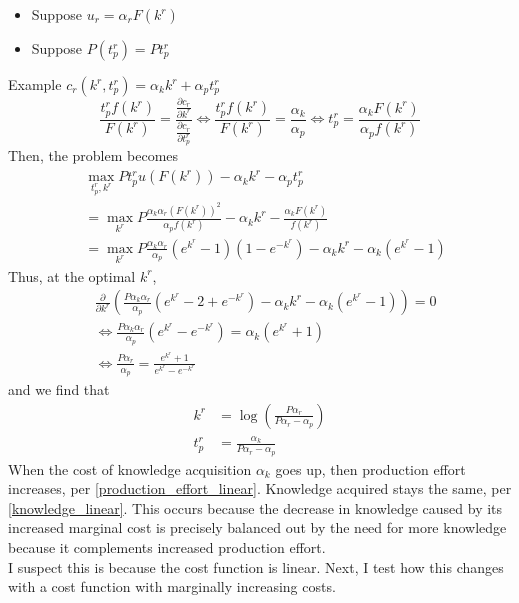 \documentclass[source/paper/main.tex]{subfiles}
\begin{document}
\begin{itemize}
    \item Suppose $u_r = \alpha_r F(k^r)$
    \item Suppose $P(t_p^r) = P t_p^r$
\end{itemize}
Example $c_r(k^r, t_p^r) = \alpha_k k^r + \alpha_p t_p^r$\\
$$\frac{t_p^r f(k^r) }{F(k^r)} = \frac{\frac{\partial c_r}{\partial k^r}}{\frac{\partial c_r}{\partial t_p^r}} \iff \frac{t_p^r f(k^r) }{F(k^r)} = \frac{\alpha_k}{\alpha_p} \iff t_p^r = \frac{\alpha_k F(k^r)}{\alpha_p f(k^r)}$$
Then, the problem becomes
\begin{align*}
    &\max_{t_p^r, k^r} P t_p^r u(F(k^r)) - \alpha_k k^r - \alpha_p t_p^r \\
    &= \max_{k^r} P\frac{\alpha_k\alpha_r (F(k^r))^2}{\alpha_p f(k^r)}  - \alpha_k k^r - \frac{\alpha_k F(k^r)}{f(k^r)} \\
    &= \max_{k^r} P\frac{\alpha_k\alpha_r}{\alpha_p} (e^{k^r} - 1)(1-e^{-k^r})  - \alpha_k k^r -\alpha_k (e^{k^r} - 1) 
\end{align*}
Thus, at the optimal $k^r$, 
\begin{align*}
    &\frac{\partial }{\partial k^r} \left(  \frac{P\alpha_k\alpha_r}{\alpha_p} (e^{k^r} - 2 + e^{-k^r}) - \alpha_k k^r - \alpha_k (e^{k^r} - 1)\right) = 0 \\
    &\iff   \frac{P\alpha_k\alpha_r}{\alpha_p} (e^{k^r} - e^{-k^r})  = \alpha_k(e^{k^r} + 1) \\
    &\iff \frac{P\alpha_r}{\alpha_p}  = \frac{e^{k^r} + 1}{e^{k^r} - e^{-k^r}} 
\end{align*}
and we find that
\begin{align}
    k^r &= \log\left(\frac{P\alpha_r}{P\alpha_r-\alpha_p}\right) \label{knowledge_linear}\\
    t_p^r &= \frac{\alpha_k}{P\alpha_r - \alpha_p}   \label{production_effort_linear} 
\end{align}
When the cost of knowledge acquisition $\alpha_k$ goes up, then production effort increases, per \ref{production_effort_linear}. Knowledge acquired stays the same, per \ref{knowledge_linear}. This occurs because the decrease in knowledge caused by its increased marginal cost is precisely balanced out by the need for more knowledge because it complements increased production effort. \\
I suspect this is because the cost function is linear. Next, I test how this changes with a cost function with marginally increasing costs. 
\end{document}
